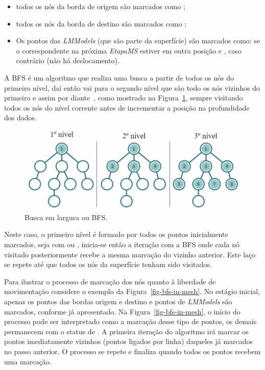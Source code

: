 \renewcommand{\labelitemi}{•}
\begin{itemize}
  \item todos os nós da borda de origem são marcados como ;
  \item todos os nós da borda de destino são marcados como ;
  \item Os pontos das \textit{LMModels} (que são parte da superfície) são marcados como:  se o correspondente na próxima \textit{EtapaMS} estiver em outra posição e , caso contrário (não há deslocamento).
\end{itemize}

A BFS é um algoritmo que realiza uma busca a partir de todos os nós do primeiro nível, daí então vai para o segundo nível que são todo os nós vizinhos do primeiro e assim por diante~\cite{Nilsson}, como mostrado na Figura~\ref{fig-bfs}, sempre visitando todos os nós do nível corrente antes de incrementar a posição na profundidade dos dados.

\begin{figure} [h]
  \begin{center}
    \includegraphics[width=350pt]{images/fig-bfs}
    \caption{Busca em largura ou BFS.~\cite{BFS}}\label{fig-bfs}
  \end{center}
\end{figure}

Neste caso, o primeiro nível é formado por todos os pontos inicialmente marcados, seja com  ou , inicia-se então a iteração com a BFS onde cada nó visitado posteriormente recebe a mesma marcação do vizinho anterior. Este laço se repete até que todos os nós da superfície tenham sido visitados.

Para ilustrar o processo de marcação dos nós quanto à liberdade de movimentação considere o exemplo da Figura~\ref{fig-bfs-in-mesh}. No estágio inicial, apenas os pontos das bordas origem e destino e pontos de \emph{LMModels} são marcados, conforme já apresentado. Na Figura~\ref{fig-bfs-in-mesh}, o início do processo pode ser interpretado como a marcação desse tipo de pontos, os demais permanecem com o status de . A primeira iteração do algoritmo irá marcar os pontos imediatamente vizinhos (pontos ligados por linha) daqueles já marcados no passo anterior. O processo se repete e finaliza quando todos os pontos recebem uma marcação.

